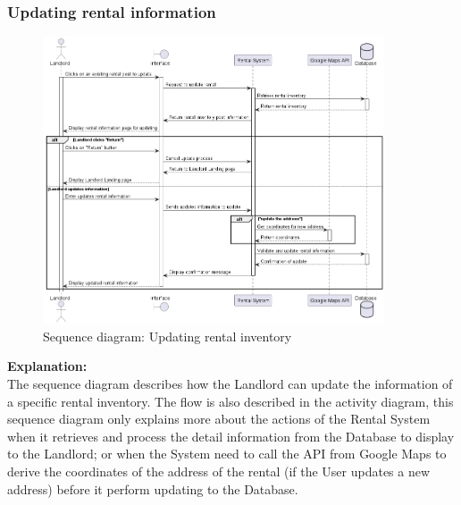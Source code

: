 \subsubsection{Updating rental information}
\begin{figure}[H]
    \centering
    \includegraphics[width=0.9\textwidth]{Images/Sequence/seq_diag_update_rental_inventory.png}
    \caption{Sequence diagram: Updating rental inventory}
    \label{fig:update-rental}
\end{figure}
\noindent \textbf{Explanation:}\\
The sequence diagram describes how the Landlord can update the information of a specific rental inventory. The flow is also described in the activity diagram, this sequence diagram only explains more about the actions of the Rental System when it retrieves and process the detail information from the Database to display to the Landlord; or when the System need to call the API from Google Maps to derive the coordinates of the address of the rental (if the User updates a new address) before it perform updating to the Database.


\newpage
